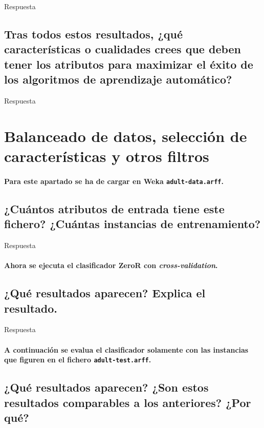 \documentclass[12pt]{article}
\begin{document}
Respuesta

\subsection{\small Tras todos estos resultados, ¿qué características o cualidades
crees que deben tener los atributos para maximizar el éxito de los algoritmos
de aprendizaje automático?}

Respuesta

\newpage

\section{Balanceado de datos, selección de características y otros filtros}

\paragraph{\small Para este apartado se ha de cargar en Weka \texttt{adult-data.arff}.}

\subsection{\small ¿Cuántos atributos de entrada tiene este fichero? ¿Cuántas
instancias de entrenamiento?}

Respuesta

\paragraph{\small Ahora se ejecuta el clasificador ZeroR con \emph{cross-validation}.}

\subsection{\small ¿Qué resultados aparecen? Explica el resultado.}

Respuesta

\paragraph{\small A continuación se evalua el clasificador solamente con las
instancias que figuren en el fichero \texttt{adult-test.arff}.}

\subsection{\small ¿Qué resultados aparecen? ¿Son estos resultados comparables a los
anteriores? ¿Por qué?}
\end{document}
